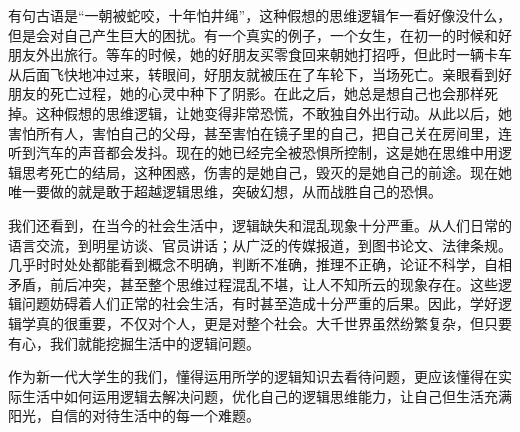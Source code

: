 \documentclass[12pt,a4paper]{ctexart}
\begin{document}
有句古语是“一朝被蛇咬，十年怕井绳”，这种假想的思维逻辑乍一看好像没什么，但是会对自己产生巨大的困扰。有一个真实的例子，一个女生，在初一的时候和好朋友外出旅行。等车的时候，她的好朋友买零食回来朝她打招呼，但此时一辆卡车从后面飞快地冲过来，转眼间，好朋友就被压在了车轮下，当场死亡。亲眼看到好朋友的死亡过程，她的心灵中种下了阴影。在此之后，她总是想自己也会那样死掉。这种假想的思维逻辑，让她变得非常恐慌，不敢独自外出行动。从此以后，她害怕所有人，害怕自己的父母，甚至害怕在镜子里的自己，把自己关在房间里，连听到汽车的声音都会发抖。现在的她已经完全被恐惧所控制，这是她在思维中用逻辑思考死亡的结局，这种困惑，伤害的是她自己，毁灭的是她自己的前途。现在她唯一要做的就是敢于超越逻辑思维，突破幻想，从而战胜自己的恐惧。

我们还看到，在当今的社会生活中，逻辑缺失和混乱现象十分严重。从人们日常的语言交流，到明星访谈、官员讲话；从广泛的传媒报道，到图书论文、法律条规。几乎时时处处都能看到概念不明确，判断不准确，推理不正确，论证不科学，自相矛盾，前后冲突，甚至整个思维过程混乱不堪，让人不知所云的现象存在。这些逻辑问题妨碍着人们正常的社会生活，有时甚至造成十分严重的后果。因此，学好逻辑学真的很重要，不仅对个人，更是对整个社会。大千世界虽然纷繁复杂，但只要有心，我们就能挖掘生活中的逻辑问题。

作为新一代大学生的我们，懂得运用所学的逻辑知识去看待问题，更应该懂得在实际生活中如何运用逻辑去解决问题，优化自己的逻辑思维能力，让自己但生活充满阳光，自信的对待生活中的每一个难题。
\end{document}

